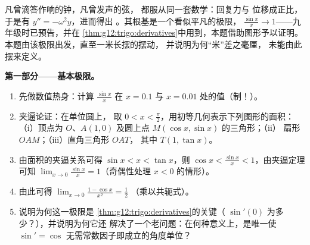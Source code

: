 \begin{problem}
\label{pb:g12:trigo:1}
凡曾滴答作响的钟，凡曾发声的弦，
都服从同一套数学：回复力与
位移成正比，于是有 $y'' = -\omega^2 y$，进而得出
。其根基是一个看似平凡的极限，
$\frac{\sin x}{x} \to 1$——九年级时已预告，并在
\cref{thm:g12:trigo:derivatives}中用到，本题借助图形予以证明。
本题由该极限出发，直至一米长摆的摆动，
并说明为何“米”差之毫厘，
未能由此摆来定义。

\medskip
\noindent\textbf{第一部分——基本极限。}
\begin{enumerate}
  \item 先做数值热身：计算 $\frac{\sin x}{x}$ 在
        $x = 0.1$ 与 $x = 0.01$ 处的值（制！）。
  \item 夹逼论证：在单位圆上，
        取 $0 < x < \frac\pi2$，用初等几何表示下列图形的面积：
        （i）顶点为 $O$、$A(1,0)$
        及圆上点 $M(\cos x, \sin x)$ 的三角形；（ii）
        扇形 $OAM$；（iii）直角三角形 $OAT$，
        其中 $T(1, \tan x)$。
  \item 由面积的夹逼关系可得
        $\sin x < x < \tan x$，则
        $\cos x < \frac{\sin x}{x} < 1$，由夹逼定理
        可知
        $\lim_{x \to 0} \frac{\sin x}{x} = 1$（奇偶性处理
        $x < 0$ 的情形）。
  \item 由此可得
        $\lim_{x \to 0} \frac{1 - \cos x}{x^2} = \frac12$
        （乘以共轭式）。
  \item 说明为何这一极限是
        \cref{thm:g12:trigo:derivatives}的关键（
        $\sin'(0)$ 为多少？），并说明为何它还
        解决了一个老问题：在何种意义上，\emph{}是唯一使
        $\sin' = \cos$ 无需常数因子即成立的角度单位？
\end{enumerate}


\end{problem}
